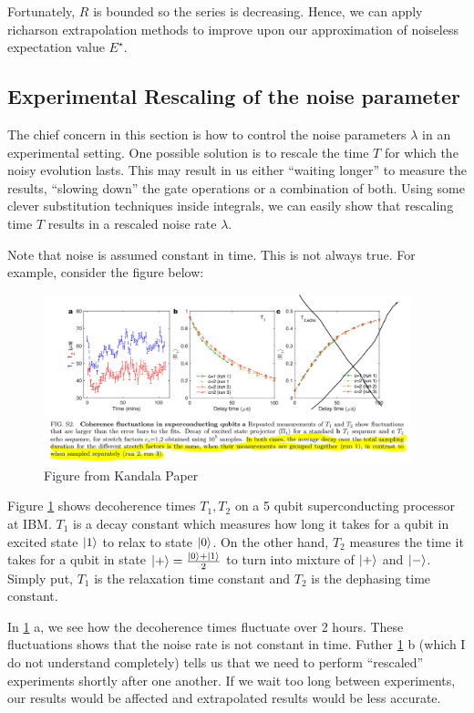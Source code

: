 \documentclass{article}
\begin{document}
Fortunately, \(R\) is bounded so the series is decreasing. Hence, we can apply
richarson extrapolation methods to improve upon our approximation of noiseless
expectation value \(E^\star\).
\subsection{Experimental Rescaling of the noise parameter}
The chief concern in this section is how to control the noise
parameters \(\lambda\) in an experimental setting. One possible solution
is to rescale the time \(T\) for which the noisy evolution lasts. This
may result in us either ``waiting longer'' to measure the results, ``slowing down''
the gate operations or a combination of both. Using some clever substitution techniques inside integrals,
we can easily show that rescaling time \(T\) results in a rescaled noise rate
 \(\lambda\).

 Note that noise is assumed constant in time. This is not always true. For example,
 consider the figure below:
 \begin{figure}[!htb]
	\centering
	\includegraphics[width=0.95\textwidth]{img/main2-f791e832.png}
	\caption{Figure from Kandala Paper}
	\label{fig1}
\end{figure}
Figure \ref{fig1} shows decoherence times \(T_1, T_2\) on a 5 qubit superconducting
processor at IBM. \(T_1\) is a decay constant which measures how long it takes for a qubit
in excited state \(\ket{1}\) to relax to state \(\ket{0}\). On the other hand, \(T_2\)
measures the time it takes for a qubit in state \(\ket{+} = \frac{\ket{0}+ \ket{1}}{2}\) to turn into mixture of \(\ket{+}\) and \(\ket{-}\). Simply put,
\(T_1\) is the relaxation time constant and \(T_2\) is the dephasing time constant.

In \ref{fig1} a, we see how the decoherence times fluctuate over 2 hours. These
fluctuations shows that the noise rate is not constant in time. Futher \ref{fig1} b
(which I do not understand completely) tells us that we need to perform ``rescaled''
experiments shortly after one another. If we wait too long between experiments,
our results would be affected and extrapolated results would be less accurate.
\end{document}
